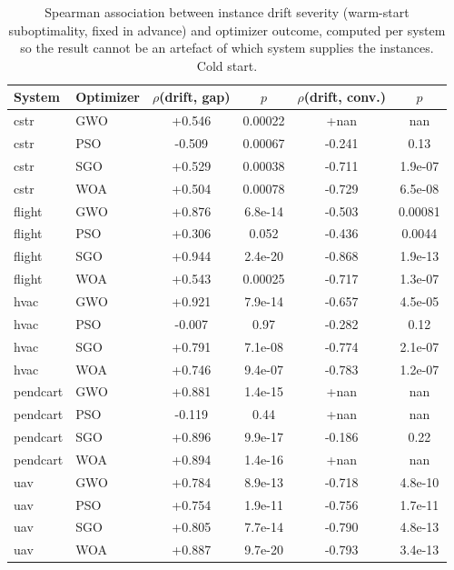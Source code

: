 \begin{table}[htbp]
\centering
\small
\caption{Spearman association between instance drift severity (warm-start suboptimality, fixed in advance) and optimizer outcome, computed per system so the result cannot be an artefact of which system supplies the instances. Cold start.}
\label{tab:drift_performance_association}
\begin{tabular}{@{}llcccc@{}}
\toprule
System & Optimizer & $\rho$(drift, gap) & $p$ & $\rho$(drift, conv.) & $p$ \\
\midrule
cstr & GWO & +0.546 & 0.00022 & +nan & nan \\
cstr & PSO & -0.509 & 0.00067 & -0.241 & 0.13 \\
cstr & SGO & +0.529 & 0.00038 & -0.711 & 1.9e-07 \\
cstr & WOA & +0.504 & 0.00078 & -0.729 & 6.5e-08 \\
flight & GWO & +0.876 & 6.8e-14 & -0.503 & 0.00081 \\
flight & PSO & +0.306 & 0.052 & -0.436 & 0.0044 \\
flight & SGO & +0.944 & 2.4e-20 & -0.868 & 1.9e-13 \\
flight & WOA & +0.543 & 0.00025 & -0.717 & 1.3e-07 \\
hvac & GWO & +0.921 & 7.9e-14 & -0.657 & 4.5e-05 \\
hvac & PSO & -0.007 & 0.97 & -0.282 & 0.12 \\
hvac & SGO & +0.791 & 7.1e-08 & -0.774 & 2.1e-07 \\
hvac & WOA & +0.746 & 9.4e-07 & -0.783 & 1.2e-07 \\
pendcart & GWO & +0.881 & 1.4e-15 & +nan & nan \\
pendcart & PSO & -0.119 & 0.44 & +nan & nan \\
pendcart & SGO & +0.896 & 9.9e-17 & -0.186 & 0.22 \\
pendcart & WOA & +0.894 & 1.4e-16 & +nan & nan \\
uav & GWO & +0.784 & 8.9e-13 & -0.718 & 4.8e-10 \\
uav & PSO & +0.754 & 1.9e-11 & -0.756 & 1.7e-11 \\
uav & SGO & +0.805 & 7.7e-14 & -0.790 & 4.8e-13 \\
uav & WOA & +0.887 & 9.7e-20 & -0.793 & 3.4e-13 \\
\bottomrule
\end{tabular}
\end{table}
